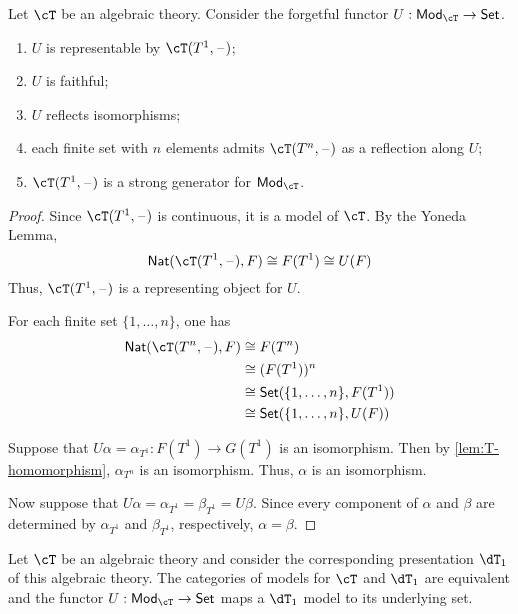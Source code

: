 \documentclass{amsart}
\begin{document}
\begin{lem}
  Let $\cT$ be an algebraic theory.
  Consider the forgetful functor $U : \mathsf{Mod}_{\cT} \to \mathsf{Set}$.
  \begin{enumerate}
  \item $U$ is representable by $\cT(T^{1}, \blank)$;
  \item $U$ is faithful;
  \item $U$ reflects isomorphisms;
  \item each finite set with $n$ elements admits $\cT(T^{n}, \blank)$ as a reflection along $U$;
  \item $\cT(T^{1}, \blank)$ is a strong generator for $\mathsf{Mod}_{\cT}$.
  \end{enumerate}
\end{lem}
\begin{proof}
  Since $\cT(T^{1},\blank)$ is continuous, it is a model of $\cT$.
  By the Yoneda Lemma,
  \[
    \mathsf{Nat}(\cT(T^{1}, \blank), F) \iso F(T^{1}) \iso U(F)
  \]
  Thus, $\cT(T^{1},\blank)$ is a representing object for $U$.

  For each finite set $\{1,\ldots,n\}$, one has
  \begin{align}
    \mathsf{Nat}(\cT(T^{n},\blank), F) &\iso F(T^{n})\\
                                       &\iso (F(T^{1}))^{n}\\
                                       &\iso \mathsf{Set}(\{1,\ldots,n\}, F(T^{1}))\\
                                       &\iso \mathsf{Set}(\{1,\ldots,n\}, U(F))
  \end{align}

  Suppose that $U\alpha = \alpha_{T^{1}} : F(T^{1}) \to G(T^{1})$ is an isomorphism.
  Then by \cref{lem:T-homomorphism}, $\alpha_{T^{n}}$ is an isomorphism.
  Thus, $\alpha$ is an isomorphism.

  Now suppose that $U\alpha = \alpha_{T^{1}} = \beta_{T^{1}} = U\beta$.
  Since every component of $\alpha$ and $\beta$ are determined by $\alpha_{T^{1}}$ and $\beta_{T^{1}}$, respectively, $\alpha = \beta$.
\end{proof}

\begin{lem}
  Let $\cT$ be an algebraic theory and consider the corresponding presentation $\dT_{1}$ of this algebraic theory.
  The categories of models for $\cT$ and $\dT_{1}$ are equivalent and the functor $U : \mathsf{Mod}_{\cT} \to \mathsf{Set}$ maps a $\dT_{1}$ model to its underlying set.
\end{lem}
\end{document}
